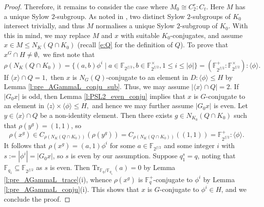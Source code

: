 \documentclass[twoside,a4paper,reqno,11pt]{amsart}
\newcommand{\<}{\langle}
\renewcommand{\>}{\rangle}
\newcommand{\la}{\langle}
\newcommand{\ra}{\rangle}
\newcommand{\leqs}{\leqslant}
\newcommand{\PSL}{\mathrm{PSL}}
\newcommand{\PGammaL}{\mathrm{P\Gamma L}}
\newcommand{\Tr}{\mathrm{Tr}}
\theoremstyle{definition}
\begin{document}
\begin{proof}
		Therefore, it remains to consider the case where $M_0\cong C_2^r{:}C_t$.
		Here $M$ has a unique Sylow $2$-subgroup. As noted in \cite[Satz 8.2(c)]{H_book}, two distinct Sylow $2$-subgroups of $K_0$ intersect trivially, and thus $M$ normalises a unique Sylow $2$-subgroup of $K_0$.
		With this in mind, we may replace $M$ and $x$ with suitable $K_0$-conjugates, and assume $x\in M\leqs N_K(Q\cap K_0)$ (recall \eqref{e:Q} for the definition of $Q$).
		To prove that $x^G\cap H\neq \emptyset,$ we first note that
		\begin{equation*}
		\rho(N_K(Q\cap K_0))=\{(a,b)\phi^i\mid a\in \mathbb{F}_{2^{f/2}}, b\in\mathbb{F}_{2^{f/2}}^\times, 1\leqs i \leqs |\phi|  \} =  (\mathbb{F}_{2^{f/2}}^+{:}\mathbb{F}_{2^{f/2}}^{\times}){:}\la \phi \ra.
		\end{equation*}
		If $\la x \ra \cap Q=1,$ then $x$ is $N_G(Q)$-conjugate to an element in $D{:}\la \phi \ra\leqs H$ by Lemma \ref{l:pre_AGammaL_conju_sub}.
		Thus, we may assume $|\la x \ra \cap Q|=2$.
		If $|G_0x|$ is odd, then Lemma \ref{l:PSL2_even_conju} implies that $x$ is $G$-conjugate to an element in $\la z \ra \times \la \phi \ra\leqs H,$ and hence we may further assume $|G_0x|$ is even.
		Let $y\in \la x \ra \cap Q$ be a non-identity element.
		Then there exists $g\in N_{K_0}(Q\cap K_0)$ such that $\rho(y^g) = (1,1)$, so
		\begin{equation*}
		\rho(x^g)\in C_{\rho(N_K(Q\cap K_0))}(\rho(y^g)) = C_{\rho(N_K(Q\cap K_0))}((1,1)) =\mathbb{F}_{2^{f/2}}^+{:}\la \phi \ra.
		\end{equation*}
		It follows that $\rho(x^g) = (a,1)\phi^i$ for some $a\in\mathbb{F}_{2^{f/2}}$ and some integer $i$ with $s:=|\phi^i| = |G_0x|$, so $s$ is even by our assumption. Suppose $q_1^s = q$, noting that $\mathbb{F}_{q_1}\subseteq \mathbb{F}_{2^{f/2}}$ as $s$ is even. Then $\Tr_{\mathbb{F}_q/\mathbb{F}_{q_1}}(a) = 0$ by Lemma \ref{l:pre_AGammaL_trace}(i), whence $\rho(x^g)$ is $\mathbb{F}_q^+$-conjugate to $\phi^i$ by Lemma \ref{l:pre_AGammaL_conju}(i). This shows that $x$ is $G$-conjugate to $\phi^i\in H$, and we conclude the proof.
	\end{proof}
	
	
\end{document}
